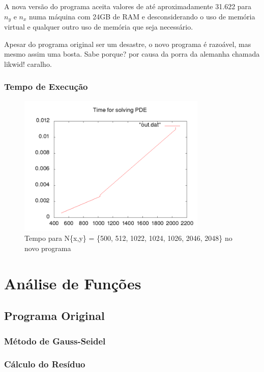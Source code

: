 \documentclass[12pt]{article}
\begin{document}
	A nova versão do programa aceita valores de até aproximadamente 31.622 para $n_y$ e $n_x$ numa máquina com 24GB de 	RAM e desconsiderando o uso de memória virtual e qualquer outro uso de memória que seja necessário.
	
	Apesar do programa original ser um desastre, o novo programa é razoável, mas mesmo assim uma bosta. Sabe porque? por causa da porra da alemanha chamada likwid! caralho.
	
	\subsubsection{Tempo de Execução}
	\begin{figure}[ht!]
		\centering
		\includegraphics[width=90mm]{newtime.png}
		\caption{Tempo para N\{x,y\} = \{500, 512, 1022, 1024, 1026, 2046, 2048\} no novo programa
		\label{overflow}}
	\end{figure}
\newpage

\section{Análise de Funções}

	\subsection{Programa Original}
		\subsubsection{Método de Gauss-Seidel}
		\subsubsection{Cálculo do Resíduo}
	
\end{document}
